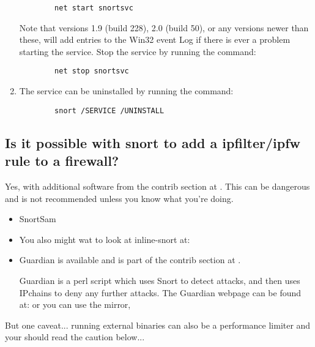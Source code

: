 \documentclass{article}
\begin{document}
\begin{enumerate}
\begin{verbatim}
        net start snortsvc
	\end{verbatim}
    Note that versions 1.9 (build 228), 2.0 (build 50), or any versions newer
    than these, will add entries to the Win32 event Log if there is ever a
    problem starting the service.
    Stop the service by running the command:
    \begin{verbatim}
        net stop snortsvc
    \end{verbatim}
\item  The service can be uninstalled by running the command:
	\begin{verbatim}
        snort /SERVICE /UNINSTALL
	\end{verbatim}
\end{enumerate}

\subsection{Is it possible with snort to add a ipfilter/ipfw rule to a firewall? }

Yes, with additional software from the contrib section at
.  This can be dangerous and is not recommended
unless you know what you're doing.

\begin{itemize}
\item SnortSam

\item You also might wat to look at inline-snort at:
\item Guardian is available and is part of the contrib section at .

Guardian is a perl script which uses Snort to detect attacks,
and then uses IPchains to deny any further attacks. The Guardian webpage can be found at:
or you can use the mirror,

\end{itemize}
But one caveat... running external binaries can also be a performance
limiter and your should read the caution below...
\end{document}
